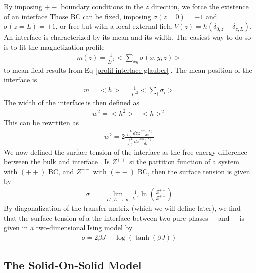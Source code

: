 By imposing $+-$ boundary conditions in the $z$ direction, we force the existence of an interface Those BC can be fixed, imposing  $\sigma(z=0) = -1$ and $\sigma(z=L)=+1$, or free but with a local external field $V(z) = h (\delta_{0,z}-\delta_{z,L})$.
An interface is characterized by its mean and its width. The easiest way to do so is to fit the magnetization profile
\begin{align}
    m(z) = \frac{1}{L'^2} < \sum_{xy} \sigma(x,y,z) >
\end{align}
to mean field results from Eq \eqref{profil-interface-glauber} . The mean position of the interface is
\begin{align}
    m = <h> = \frac{1}{L'^2} < \sum_i \sigma_i >
\end{align}
The width of the interface is then defined  as 
\begin{align}
    w^2 = <h^2>-<h>^2
\end{align}
This can be rewrtiten \cite{stecki_magnetization_1994} as
\begin{align}
    w^2 = 2 \frac{ \int_0^L dz z \frac{d m(z)}{dz}}{\int_0^L dz \frac{d m(z)}{dz}}
\end{align}
We now defined the surface tension of the interface as the free energy difference between  the bulk and interface \cite{richards_numerical_1993}. Is $Z^{++}$ si the partition function of a system with $(++)$ BC, and $Z^{+-}$ with $(+-)$ BC, then the surface tension \cite{abraham_interface_1976} is given by
\begin{align}
    \sigma &= \lim_{L',L \to \infty} \frac{1}{L'^2} \ln \left( \frac{Z^{+-}}{Z^{++}} \right) 
\end{align}
By diagonalization of the transfer matrix (which we will define later), we find that the surface tension of a the interface between two pure phases $+$ and $-$ is given in a two-dimensional Ising model \cite{abraham_transfer_1973} by
\begin{align}
    \sigma = 2 \beta J + \log(\tanh(\beta J))    
\end{align}

\newpage	
    \subsection{The Solid-On-Solid Model}
    \label{sec-sos}


